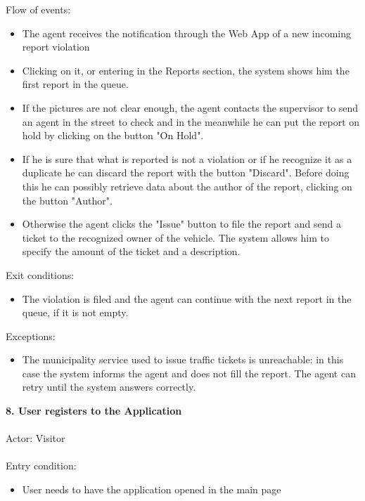 \documentclass[a4paper]{report}
\begin{document}
Flow of events:
\begin{itemize} 
\item The agent receives the notification through the Web App of a new incoming report violation
\item Clicking on it, or entering in the Reports section, the system shows him the first report in the queue.
\item If the pictures are not clear enough, the agent contacts the supervisor to send an agent in the street to check and in the meanwhile he can put the report on hold by clicking on the button "On Hold".
\item If he is sure that what is reported is not a violation or if he recognize it as a duplicate he can discard the report with the button "Discard". Before doing this he can possibly retrieve data about the author of the report, clicking on the button "Author".
\item Otherwise the agent clicks the "Issue" button to file the report and send a ticket to the recognized owner of the vehicle. The system allows him to specify the amount of the ticket and a description.
\end{itemize}
Exit conditions:
\begin{itemize}
\item The violation is filed and the agent can continue with the next report in the queue, if it is not empty.
\end{itemize}
Exceptions: 
\begin{itemize}
\item The municipality service used to issue traffic tickets is unreachable: in this case the system informs the agent and does not fill the report. The agent can retry until the system answers correctly.
\end{itemize}
\textbf{8. User registers to the Application}\label{uc:8}
\\ \\
Actor: Visitor \\ \\
Entry condition: 
\begin{itemize}
\item User needs to have the application opened in the main page
\end{itemize}
\end{document}
